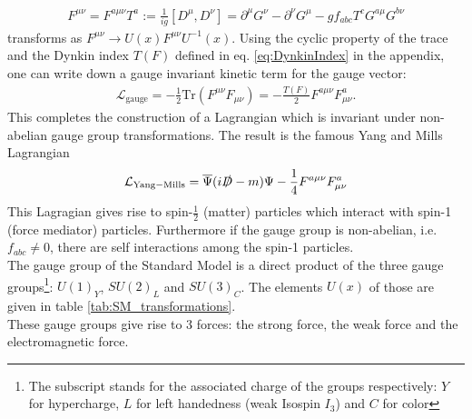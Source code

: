 \begin{align}
F^{\mu\nu} = F^{a\mu\nu}T^a := \frac{1}{ig}[D^\mu,D^\nu] = \partial^\mu G^\nu - \partial^\nu G^\mu - g f_{abc} T^c G^{a\mu}G^{b\nu}
\end{align}
transforms as $F^{\mu\nu} \to U(x)F^{\mu\nu}U^{-1}(x)$. Using the cyclic property of the trace and the Dynkin index $T(F)$ defined in eq. \eqref{eq:DynkinIndex} in the appendix, one can write down a gauge invariant kinetic term for the gauge vector:
\begin{align}
\mathcal{L}_{\mathrm{gauge}} = - \frac{1}{2} \mathrm{Tr} \left( F^{\mu\nu}F_{\mu\nu} \right) = -\frac{T(F)}{2} F^{a\mu\nu}F^a_{\mu\nu}.
\end{align}
This completes the construction of a Lagrangian which is invariant under non-abelian gauge group transformations. The result is the famous Yang and Mills Lagrangian \cite{PhysRev.96.191}
\begin{align}
\mathcal{L}_{\mathrm{Yang-Mills}} = \overline{\Psi}(i\slashed{D} - m)\Psi - \frac{1}{4}F^{a\mu\nu}F^a_{\mu\nu}
\end{align}
This Lagragian gives rise to spin-$\frac{1}{2}$ (matter) particles which interact with spin-1 (force mediator) particles. Furthermore if the gauge group is non-abelian, i.e. $f_{abc} \neq 0$, there are self interactions among the spin-1 particles.\\
The gauge group of the Standard Model is a direct product of the three gauge groups\footnote{The subscript stands for the associated charge of the groups respectively: $Y$ for hypercharge, $L$ for left handedness (weak Isospin $I_3$) and $C$ for color}: $U(1)_Y$, $SU(2)_L$ and $SU(3)_C$. The elements $U(x)$ of those are given in table \ref{tab:SM_transformations}.\\
These gauge groups give rise to 3 forces: the strong force, the weak force and the electromagnetic force.
